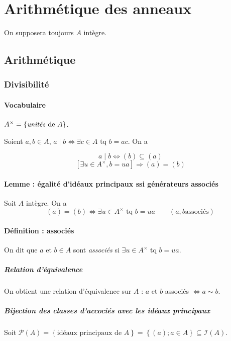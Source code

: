 \documentclass[reqno,a4paper,10pt]{report}
\makeatletter
\newcommand{\set}[1]{\left\lbrace #1 \right\rbrace} %
\newcommand{\soo}{\Longrightarrow}
\newcommand{\pfootnote}[1]{\up{(}\footnote{#1}\up{)}} %
\let\olditemize=\itemize%
\renewenvironment{itemize}{%
    \olditemize%
  }{%
    \@noparlisttrue%
    \endlist%
  }%
\makeatother
\begin{document}
\pagebreak
\part{Arithmétique des anneaux}
On supposera toujours $A$ intègre.

\chapter{Arithmétique}
\section{Divisibilité}
\subsection{Vocabulaire}
\begin{itemize}
  \item $A^\times = \set{\text{\emph{unités} de } A}$.
  \item Soient $a,b \in A$, $a \mid b \iff \exists c \in A$ tq $b=ac$. On a
    \begin{comment}
      \pfootnote{Preuve 18/11/09 p3}
    \end{comment}
    \[a \mid b \iff (b) \subseteq (a)\]
    \[ [\exists u \in A^\times, b = ua] \soo (a) = (b)\]
\end{itemize}

\subsection{Lemme : égalité d'idéaux principaux ssi générateurs associés}
Soit $A$ intègre. On a
\[(a)=(b) \iff \exists u \in A^\times \text{ tq } b=ua \qquad(a,b \text{
associés})\]

\subsection{Définition : associés}
On dit que $a$ et $b \in A$ sont \emph{associés} si $\exists u \in A^\times$ tq
$b=ua$.

\subsubsection*{Relation d'équivalence} On obtient une relation
d'équivalence sur $A$ : $a$ et $b$ associés $\iff a \sim b$.

\subsubsection{Bijection des classes d'accociés avec les idéaux principaux}
Soit $\mathcal P (A) = \set{\text{idéaux principaux de }A}=\set{(a);a\in
A}\subseteq \mathcal I(A)$.
\end{document}
